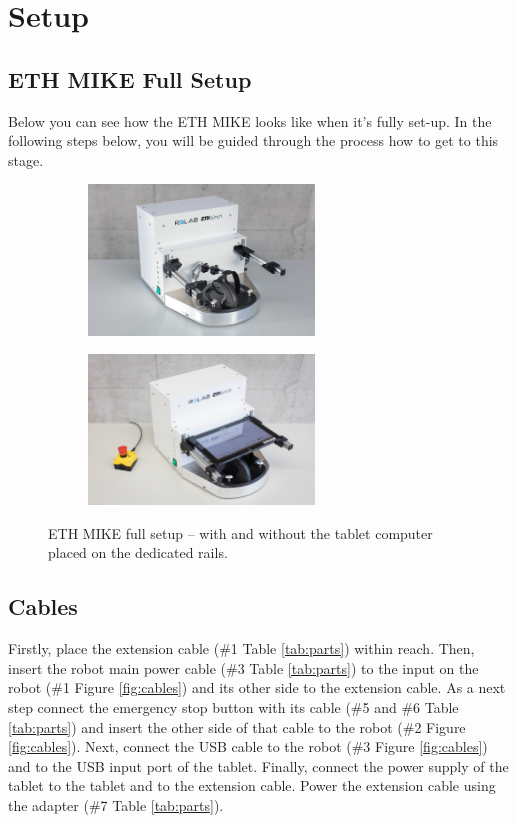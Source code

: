\documentclass[10pt,oneside,a4paper]{article}
\begin{document}
\newpage
\section{Setup}

\subsection{ETH MIKE Full Setup}
Below you can see how the ETH MIKE looks like when it’s fully set-up. In the following steps below, you will be guided through the process how to get to this stage.

\begin{figure}[h!]
\centering
\begin{subfigure}[b]{0.48\textwidth}
	\includegraphics[height=4cm]{images/Hardware/ETHMIKE.jpg}
\end{subfigure}
\hfill
\begin{subfigure}[b]{0.48\textwidth}
	\includegraphics[height=4cm]{images/Hardware/ETHMIKE2.png}
\end{subfigure}
\caption{ETH MIKE full setup – with and without the tablet computer placed on the dedicated rails.}
\label{fig:mike}
\end{figure}

\subsection{Cables}
Firstly, place the extension cable (\#1 Table \ref{tab:parts}) within reach. Then, insert the robot main power cable (\#3 Table \ref{tab:parts}) to the input on the robot (\#1 Figure \ref{fig:cables}) and its other side to the extension cable. As a next step connect the emergency stop button with its cable (\#5 and \#6 Table \ref{tab:parts}) and insert the other side of that cable to the robot (\#2 Figure \ref{fig:cables}). Next, connect the USB cable to the robot (\#3 Figure \ref{fig:cables}) and to the USB input port of the tablet. Finally, connect the power supply of the tablet to the tablet and to the extension cable. Power the extension cable using the adapter (\#7 Table \ref{tab:parts}). 
\end{document}
